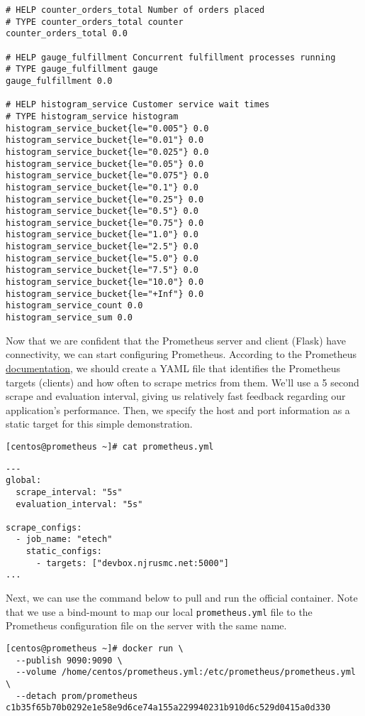 \begin{verbatim}
# HELP counter_orders_total Number of orders placed
# TYPE counter_orders_total counter
counter_orders_total 0.0

# HELP gauge_fulfillment Concurrent fulfillment processes running
# TYPE gauge_fulfillment gauge
gauge_fulfillment 0.0

# HELP histogram_service Customer service wait times
# TYPE histogram_service histogram
histogram_service_bucket{le="0.005"} 0.0
histogram_service_bucket{le="0.01"} 0.0
histogram_service_bucket{le="0.025"} 0.0
histogram_service_bucket{le="0.05"} 0.0
histogram_service_bucket{le="0.075"} 0.0
histogram_service_bucket{le="0.1"} 0.0
histogram_service_bucket{le="0.25"} 0.0
histogram_service_bucket{le="0.5"} 0.0
histogram_service_bucket{le="0.75"} 0.0
histogram_service_bucket{le="1.0"} 0.0
histogram_service_bucket{le="2.5"} 0.0
histogram_service_bucket{le="5.0"} 0.0
histogram_service_bucket{le="7.5"} 0.0
histogram_service_bucket{le="10.0"} 0.0
histogram_service_bucket{le="+Inf"} 0.0
histogram_service_count 0.0
histogram_service_sum 0.0
\end{verbatim}

Now that we are confident that the Prometheus server and client (Flask) have
connectivity, we can start configuring Prometheus. According to the Prometheus
\href{https://prometheus.io/docs/introduction/first_steps/}{documentation},
we should create a YAML file that identifies the Prometheus targets (clients)
and how often to scrape metrics from them. We'll use a 5 second scrape and
evaluation interval, giving us relatively fast feedback regarding our
application's performance. Then, we specify the host and port information
as a static target for this simple demonstration.

\begin{verbatim}
[centos@prometheus ~]# cat prometheus.yml
\end{verbatim}

\begin{verbatim}
---
global:
  scrape_interval: "5s"
  evaluation_interval: "5s"

scrape_configs:
  - job_name: "etech"
    static_configs:
      - targets: ["devbox.njrusmc.net:5000"]
...
\end{verbatim}

Next, we can use the command below to pull and run the official container.
Note that we use a bind-mount to map our local \verb|prometheus.yml|
file to the Prometheus configuration file on the server with the same name.

\begin{verbatim}
[centos@prometheus ~]# docker run \
  --publish 9090:9090 \
  --volume /home/centos/prometheus.yml:/etc/prometheus/prometheus.yml \
  --detach prom/prometheus
c1b35f65b70b0292e1e58e9d6ce74a155a229940231b910d6c529d0415a0d330
\end{verbatim}

